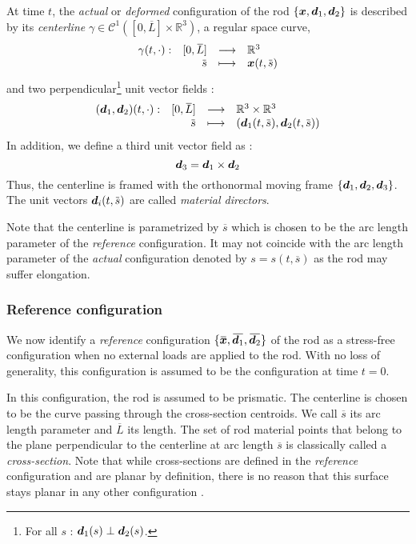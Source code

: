 At time $t$, the \emph{actual} or \emph{deformed} configuration of the rod $\{{\boldsymbol{x}}, {\boldsymbol{d}_1}, {\boldsymbol{d}_2}\}$ is described by its \emph{centerline} $\gamma \in \mathcal{C}^1([0,\overbar{L}]\times \mathbb{R}^3)$, a regular space curve, 
\begin{equation}
	\fonctionL{\gamma(t, \cdot)}{[0,\overbar{L}]}{\mathbb{R}^3}{\overbar{s}}{\vect{x}(t,\overbar{s})}
\end{equation}
and two perpendicular\footnote{For all $s$ : $\boldsymbol{d}_1(s) \perp \boldsymbol{d}_2(s)$.} unit vector fields : 
\begin{equation}
	\fonctionL{(\vect{d}_1,\vect{d}_2)(t, \cdot)}{[0,\overbar{L}]}{\mathbb{R}^3 \times \mathbb{R}^3}{\overbar{s}}{(\vect{d}_1(t,\overbar{s}), \vect{d}_2(t,\overbar{s}))}
\end{equation}
In addition, we define a third unit vector field as : 
\begin{equation}
	\boldsymbol{d}_3 = \boldsymbol{d}_1 \times \boldsymbol{d}_2
\end{equation}
Thus, the centerline is framed with the orthonormal moving frame $\{\boldsymbol{d}_1, \boldsymbol{d}_2, \boldsymbol{d}_3\}$. The unit vectors $\vect{d}_i(t,\overbar{s})$ are called \emph{material directors}.

Note that the centerline is parametrized by $\overbar{s}$ which is chosen to be the arc length parameter of the \emph{reference} configuration. It may not coincide with the arc length parameter of the \emph{actual} configuration denoted by $s = s(t, \overbar{s})$ as the rod may suffer elongation.

\subsubsection{Reference configuration}
We now identify a \emph{reference} configuration $\{\overbar{\vect{x}}, \overbar{\vect{d}_1}, \overbar{\vect{d}_2}\}$ of the rod as a stress-free configuration when no external loads are applied to the rod. With no loss of generality, this configuration is assumed to be the configuration at time $t=0$. 

In this configuration, the rod is assumed to be prismatic. The centerline is chosen to be the curve passing through the cross-section centroids. We call $\overbar{s}$ its arc length parameter and $\overbar{L}$ its length. The set of rod material points that belong to the plane perpendicular to the centerline at arc length $\overbar{s}$ is classically called a \emph{cross-section}. Note that while cross-sections are defined in the \emph{reference} configuration and are planar by definition, there is no reason that this surface stays planar in any other configuration \cite[p.~5]{Dill1992}.

